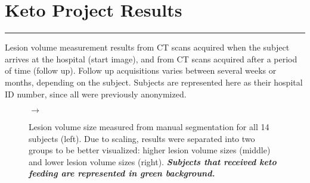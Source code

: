 




\section*{Keto Project Results}
	\vspace*{-0.4cm}\rule{10cm}{0.1mm}
	
	\Large{Lesion volume measurement results from CT scans acquired when the subject arrives at the hospital (start image), and from CT scans acquired after a period of time (follow up). Follow up acquisitions varies between several weeks or months, depending on the subject. Subjects are represented here as their hospital ID number, since all were previously anonymized.} 
	
\begin{figure}[!h]
    \begin{minipage}{0.5\linewidth}
        \centering
        \begin{minipage}{0.25\linewidth}\hspace{-1cm}
            
        \end{minipage}
        \begin{minipage}{0.25\linewidth}\hspace{3.5cm}
            \Huge{$\rightarrow$}
        \end{minipage}
        \begin{minipage}{0.25\linewidth}
            
        \end{minipage}
        \begin{minipage}{0.25\linewidth}\vspace{-10.93cm}\hspace{15.5cm}
            
        \end{minipage}
    \end{minipage}\vspace{-0.5cm}
    \caption{Lesion volume size measured from manual segmentation for all 14 subjects (left). Due to scaling, results were separated into two groups to be better visualized: higher lesion volume sizes (middle) and lower lesion volume sizes (right). \emph{\textbf{Subjects that received keto feeding are represented in green background.}}}
\end{figure}

